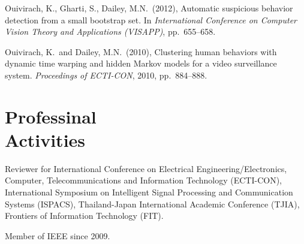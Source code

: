\documentclass[margin, 10pt]{res}
\begin{document}
\begin{resume}
Ouivirach, K., Gharti, S., Dailey, M.N.\ (2012), Automatic suspicious behavior
detection from a small bootstrap set. In {\it International Conference on
Computer Vision Theory and Applications (VISAPP)}, pp.\ 655--658.

Ouivirach, K.\ and Dailey, M.N.\ (2010), Clustering human behaviors with
dynamic time warping and hidden Markov models for a video surveillance system.
{\it Proceedings of ECTI-CON}, 2010, pp.\ 884--888.

\section{Professinal \\ Activities}

Reviewer for International Conference on Electrical Engineering/Electronics,
Computer, Telecommunications and Information Technology (ECTI-CON),
International Symposium on Intelligent Signal Processing and Communication
Systems (ISPACS), Thailand-Japan International Academic Conference (TJIA),
Frontiers of Information Technology (FIT).

Member of IEEE since 2009.

\end{resume}
\end{document}
